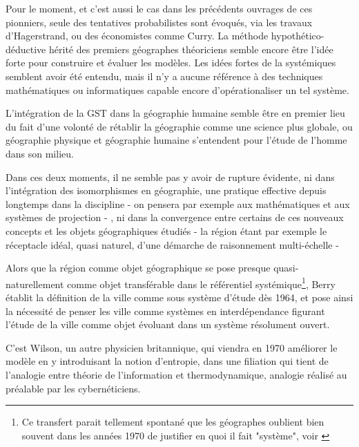 {Pour le moment, et c'est aussi le cas dans les précédents ouvrages de ces pionniers, seule des tentatives probabilistes sont évoqués, via les travaux d'Hagerstrand, ou des économistes comme Curry. La méthode hypothético-déductive hérité des premiers géographes théoriciens semble encore être l'idée forte pour construire et évaluer les modèles. Les idées fortes de la systémiques semblent avoir été entendu, mais il n'y a aucune référence à des techniques mathématiques ou informatiques capable encore d'opérationaliser un tel système. %

L'intégration de la GST dans la géographie humaine semble être en premier lieu du fait d'une volonté de rétablir la géographie comme une science plus globale, ou géographie physique et géographie humaine s'entendent pour l'étude de l'homme dans son milieu.


Dans ces deux moments, il ne semble pas y avoir de rupture évidente, ni dans l'intégration des isomorphismes en géographie, une pratique effective depuis longtemps dans la discipline - on pensera par exemple aux mathématiques et aux systèmes de projection - , ni dans la convergence entre certains de ces nouveaux concepts et les objets géographiques étudiés - la région étant par exemple le réceptacle idéal, quasi naturel, d'une démarche de raisonnement multi-échelle -

Alors que la région comme objet géographique se pose presque quasi-naturellement comme objet transférable dans le référentiel systémique\footnote{ Ce transfert parait tellement spontané que les géographes oublient bien souvent dans les années 1970 de justifier en quoi il fait "système", voir \autocite{Orain2001}}, Berry établit la définition de la ville comme sous système d'étude dès 1964, et pose ainsi la nécessité de penser les ville comme systèmes en interdépendance figurant l'étude de la ville comme objet évoluant dans un système résolument ouvert. 



C'est Wilson, un autre physicien britannique, qui viendra en 1970 améliorer le modèle en y introduisant la notion d'entropie, dans une filiation qui tient de l'analogie entre théorie de l'information et thermodynamique, analogie réalisé au préalable par les cybernéticiens.

}

